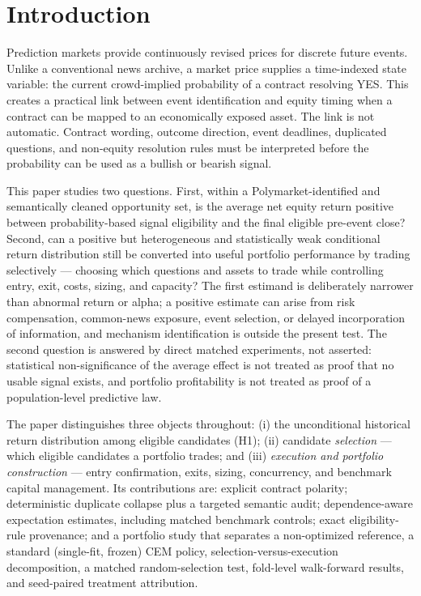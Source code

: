 \documentclass[sigconf,anonymous]{acmart}
\begin{document}
\maketitle

\section{Introduction}

Prediction markets provide continuously revised prices for discrete future events. Unlike a conventional news archive, a market price supplies a time-indexed state variable: the current crowd-implied probability of a contract resolving YES. This creates a practical link between event identification and equity timing when a contract can be mapped to an economically exposed asset. The link is not automatic. Contract wording, outcome direction, event deadlines, duplicated questions, and non-equity resolution rules must be interpreted before the probability can be used as a bullish or bearish signal.

This paper studies two questions. First, within a Polymarket-identified and semantically cleaned opportunity set, is the average net equity return positive between probability-based signal eligibility and the final eligible pre-event close? Second, can a positive but heterogeneous and statistically weak conditional return distribution still be converted into useful portfolio performance by trading selectively --- choosing which questions and assets to trade while controlling entry, exit, costs, sizing, and capacity? The first estimand is deliberately narrower than abnormal return or alpha; a positive estimate can arise from risk compensation, common-news exposure, event selection, or delayed incorporation of information, and mechanism identification is outside the present test. The second question is answered by direct matched experiments, not asserted: statistical non-significance of the average effect is not treated as proof that no usable signal exists, and portfolio profitability is not treated as proof of a population-level predictive law.

The paper distinguishes three objects throughout: (i) the unconditional historical return distribution among eligible candidates (H1); (ii) candidate \emph{selection} --- which eligible candidates a portfolio trades; and (iii) \emph{execution and portfolio construction} --- entry confirmation, exits, sizing, concurrency, and benchmark capital management. Its contributions are: explicit contract polarity; deterministic duplicate collapse plus a targeted semantic audit; dependence-aware expectation estimates, including matched benchmark controls; exact eligibility-rule provenance; and a portfolio study that separates a non-optimized reference, a standard (single-fit, frozen) CEM policy, selection-versus-execution decomposition, a matched random-selection test, fold-level walk-forward results, and seed-paired treatment attribution.
\end{document}
